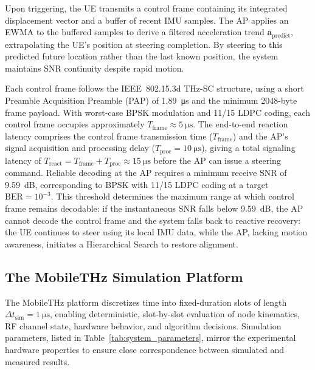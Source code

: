 \documentclass[fleqn,10pt]{wlscirep}
\begin{document}
Upon triggering, the UE transmits a control frame containing its integrated displacement vector and a buffer of recent IMU samples. The AP applies an EWMA to the buffered samples to derive a filtered acceleration trend $\bar{\mathbf{a}}_{\text{predict}}$, extrapolating the UE's position at steering completion. By steering to this predicted future location rather than the last known position, the system maintains SNR continuity despite rapid motion.

Each control frame follows the IEEE~802.15.3d THz-SC structure\cite{9269931}, using a short Preamble Acquisition Preamble (PAP) of \SI{1.89}{\micro\second} and the minimum 2048-byte frame payload. With worst-case BPSK modulation and 11/15 LDPC coding, each control frame occupies approximately $T_{\text{frame}} \approx \SI{5}{\micro\second}$. The end-to-end reaction latency comprises the control frame transmission time ($T_{\text{frame}}$) and the AP's signal acquisition and processing delay ($T_{\text{proc}} = \SI{10}{\micro\second}$), giving a total signaling latency of $T_{\text{react}} = T_{\text{frame}} + T_{\text{proc}} \approx \SI{15}{\micro\second}$ before the AP can issue a steering command. Reliable decoding at the AP requires a minimum receive SNR of \SI{9.59}{\deci\bel}, corresponding to BPSK with 11/15 LDPC coding at a target $\text{BER} = 10^{-3}$. This threshold determines the maximum range at which control frame remains decodable: if the instantaneous SNR falls below \SI{9.59}{\deci\bel}, the AP cannot decode the control frame and the system falls back to reactive recovery: the UE continues to steer using its local IMU data, while the AP, lacking motion awareness, initiates a Hierarchical Search to restore alignment.



\subsection*{The MobileTHz Simulation Platform}
The MobileTHz platform discretizes time into fixed-duration slots of length $\Delta t_{\text{sim}} = \SI{1}{\micro\second}$, enabling deterministic, slot-by-slot evaluation of node kinematics, RF channel state, hardware behavior, and algorithm decisions. Simulation parameters, listed in Table~\ref{tab:system_parameters}, mirror the experimental hardware properties to ensure close correspondence between simulated and measured results.
\end{document}
